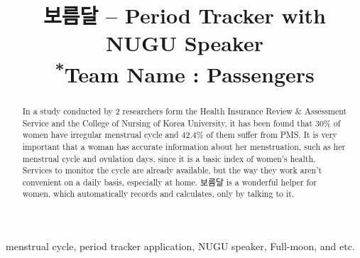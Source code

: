 \documentclass[conference]{IEEEtran}
\begin{document}
\title{보름달 – Period Tracker with NUGU Speaker\\
{\footnotesize \textsuperscript{*}Team Name : Passengers}
}

\author{
\and
{}
\and
{}
\and
{}
}

\maketitle

\begin{abstract}
In a study conducted by 2 researchers form the Health Insurance Review \& Assessment Service and the College of Nursing of Korea University, it has been found that 30\% of women have irregular menstrual cycle and 42.4\% of them suffer from PMS. It is very important that a woman has accurate information about her menstruation, such as her menstrual cycle and ovulation days, since it is a basic index of women’s health. Services to monitor the cycle are already available, but the way they work aren't convenient on a daily basis, especially at home. 보름달 is a wonderful helper for women, which automatically records and calculates, only by talking to it.
\end{abstract}

\begin{IEEEkeywords}
menstrual cycle, period tracker application, NUGU speaker, Full-moon, and etc.
\end{IEEEkeywords}
\end{document}
